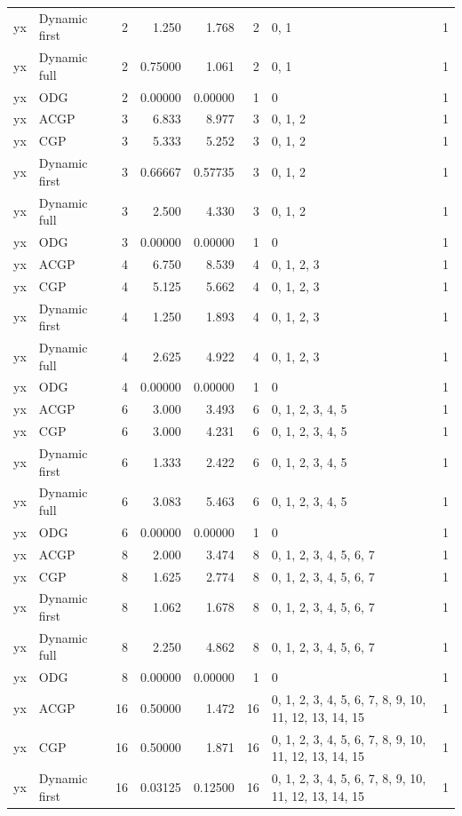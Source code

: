 \documentclass[10pt,a4paper]{article}
\begin{document}
\begin{longtable}{@{}p{23mm}p{29mm}rrrrp{36mm}r@{}}
yx & Dynamic first & 2 & 1.250 & 1.768 & 2 & 0, 1 & 1 \\
yx & Dynamic full & 2 & 0.75000 & 1.061 & 2 & 0, 1 & 1 \\
yx & ODG & 2 & 0.00000 & 0.00000 & 1 & 0 & 1 \\
yx & ACGP & 3 & 6.833 & 8.977 & 3 & 0, 1, 2 & 1 \\
yx & CGP & 3 & 5.333 & 5.252 & 3 & 0, 1, 2 & 1 \\
yx & Dynamic first & 3 & 0.66667 & 0.57735 & 3 & 0, 1, 2 & 1 \\
yx & Dynamic full & 3 & 2.500 & 4.330 & 3 & 0, 1, 2 & 1 \\
yx & ODG & 3 & 0.00000 & 0.00000 & 1 & 0 & 1 \\
yx & ACGP & 4 & 6.750 & 8.539 & 4 & 0, 1, 2, 3 & 1 \\
yx & CGP & 4 & 5.125 & 5.662 & 4 & 0, 1, 2, 3 & 1 \\
yx & Dynamic first & 4 & 1.250 & 1.893 & 4 & 0, 1, 2, 3 & 1 \\
yx & Dynamic full & 4 & 2.625 & 4.922 & 4 & 0, 1, 2, 3 & 1 \\
yx & ODG & 4 & 0.00000 & 0.00000 & 1 & 0 & 1 \\
yx & ACGP & 6 & 3.000 & 3.493 & 6 & 0, 1, 2, 3, 4, 5 & 1 \\
yx & CGP & 6 & 3.000 & 4.231 & 6 & 0, 1, 2, 3, 4, 5 & 1 \\
yx & Dynamic first & 6 & 1.333 & 2.422 & 6 & 0, 1, 2, 3, 4, 5 & 1 \\
yx & Dynamic full & 6 & 3.083 & 5.463 & 6 & 0, 1, 2, 3, 4, 5 & 1 \\
yx & ODG & 6 & 0.00000 & 0.00000 & 1 & 0 & 1 \\
yx & ACGP & 8 & 2.000 & 3.474 & 8 & 0, 1, 2, 3, 4, 5, 6, 7 & 1 \\
yx & CGP & 8 & 1.625 & 2.774 & 8 & 0, 1, 2, 3, 4, 5, 6, 7 & 1 \\
yx & Dynamic first & 8 & 1.062 & 1.678 & 8 & 0, 1, 2, 3, 4, 5, 6, 7 & 1 \\
yx & Dynamic full & 8 & 2.250 & 4.862 & 8 & 0, 1, 2, 3, 4, 5, 6, 7 & 1 \\
yx & ODG & 8 & 0.00000 & 0.00000 & 1 & 0 & 1 \\
yx & ACGP & 16 & 0.50000 & 1.472 & 16 & 0, 1, 2, 3, 4, 5, 6, 7, 8, 9, 10, 11, 12, 13, 14, 15 & 1 \\
yx & CGP & 16 & 0.50000 & 1.871 & 16 & 0, 1, 2, 3, 4, 5, 6, 7, 8, 9, 10, 11, 12, 13, 14, 15 & 1 \\
yx & Dynamic first & 16 & 0.03125 & 0.12500 & 16 & 0, 1, 2, 3, 4, 5, 6, 7, 8, 9, 10, 11, 12, 13, 14, 15 & 1 \\

\end{longtable}
\end{document}
